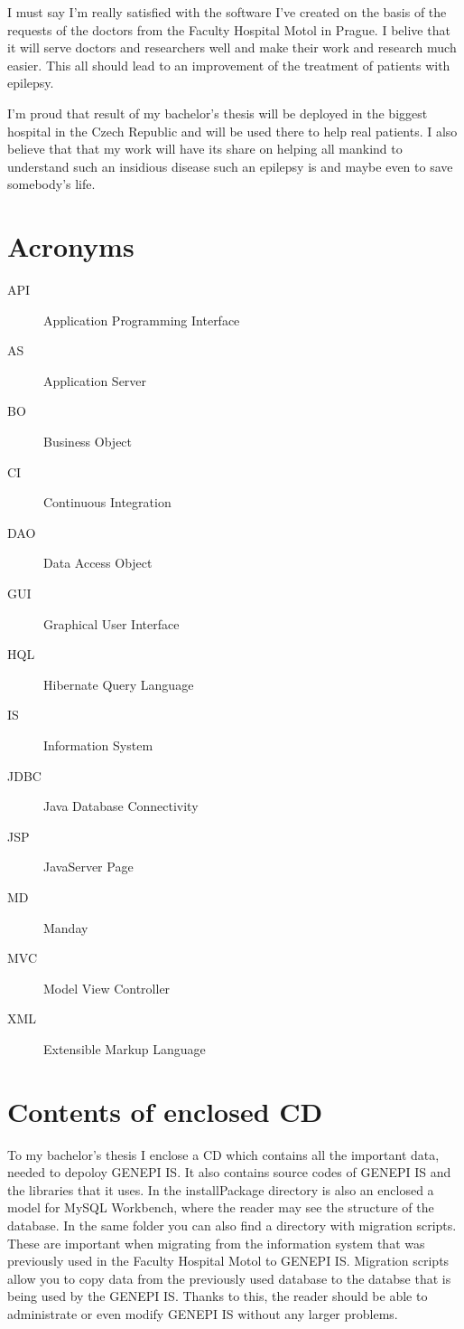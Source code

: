 \documentclass[thesis=B,english]{FITthesis}[2012/10/20]
\begin{document}
\begin{conclusion}
I must say I'm really satisfied with the software I've created on the basis of the requests of the doctors from the Faculty Hospital Motol in Prague. I belive that it will serve doctors and researchers well and make their work and research much easier. This all should lead to an improvement of the treatment of patients with epilepsy.

I'm proud that result of my bachelor's thesis will be deployed in the biggest hospital in the Czech Republic and will be used there to help real patients. I also believe that that my work will have its share on helping all mankind to understand such an insidious disease such an epilepsy is and maybe even to save somebody's life.

\end{conclusion}




\appendix

\chapter{Acronyms}
\begin{description}
	\item[API] Application Programming Interface
	\item[AS] Application Server
	\item[BO] Business Object
	\item[CI] Continuous Integration
	\item[DAO] Data Access Object
	\item[GUI] Graphical User Interface
	\item[HQL] Hibernate Query Language
	\item[IS] Information System
	\item[JDBC] Java Database Connectivity
	\item[JSP] JavaServer Page
	\item[MD] Manday
	\item[MVC] Model View Controller
	\item[XML] Extensible Markup Language
\end{description}

\chapter{Contents of enclosed CD}
To my bachelor's thesis I enclose a CD which contains all the important data, needed to depoloy GENEPI IS. It also contains source codes of GENEPI IS and the libraries that it uses. In the installPackage directory is also an enclosed a model for MySQL Workbench, where the reader may see the structure of the database. In the same folder you can also find a directory with migration scripts. These are important when migrating from the information system that was previously used in the Faculty Hospital Motol to GENEPI IS. Migration scripts allow you to copy data from the previously used database to the databse that is being used by the GENEPI IS. Thanks to this, the reader should be able to administrate or even modify GENEPI IS without any larger problems.
\end{document}
